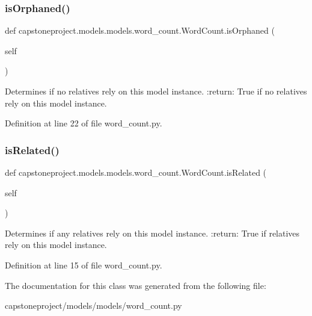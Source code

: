 \subsubsection{\texorpdfstring{is\+Orphaned()}{isOrphaned()}}
{\footnotesize\ttfamily def capstoneproject.\+models.\+models.\+word\+\_\+count.\+Word\+Count.\+is\+Orphaned (\begin{DoxyParamCaption}\item[{}]{self }\end{DoxyParamCaption})}

\begin{DoxyVerb}Determines if no relatives rely on this model instance.
:return: True if no relatives rely on this model instance.
\end{DoxyVerb}
 

Definition at line 22 of file word\+\_\+count.\+py.

\mbox{\label{classcapstoneproject_1_1models_1_1models_1_1word__count_1_1_word_count_abe18ee553574addf798e43a4a17d8344}} 
\subsubsection{\texorpdfstring{is\+Related()}{isRelated()}}
{\footnotesize\ttfamily def capstoneproject.\+models.\+models.\+word\+\_\+count.\+Word\+Count.\+is\+Related (\begin{DoxyParamCaption}\item[{}]{self }\end{DoxyParamCaption})}

\begin{DoxyVerb}Determines if any relatives rely on this model instance.
:return: True if relatives rely on this model instance.
\end{DoxyVerb}
 

Definition at line 15 of file word\+\_\+count.\+py.



The documentation for this class was generated from the following file\+:\begin{DoxyCompactItemize}
\item 
capstoneproject/models/models/word\+\_\+count.\+py\end{DoxyCompactItemize}
